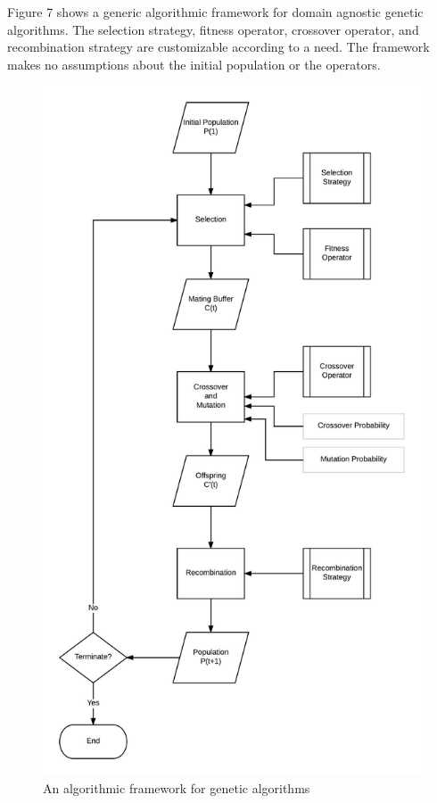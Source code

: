 \documentclass[12pt,a4paper]{article}
\begin{document}
	Figure 7 shows a generic algorithmic framework for domain agnostic genetic algorithms. The selection strategy, fitness operator, crossover operator, and recombination strategy are customizable according to a need. The framework makes no assumptions about the initial population or the operators.
	
	\begin{figure}[H]
		\includegraphics[width=\textwidth,height=\textheight]{"GA-block1"}
		\caption{An algorithmic framework for genetic algorithms}
		\centering
		\label{fig-framework}
	\end{figure}
	
\end{document}

